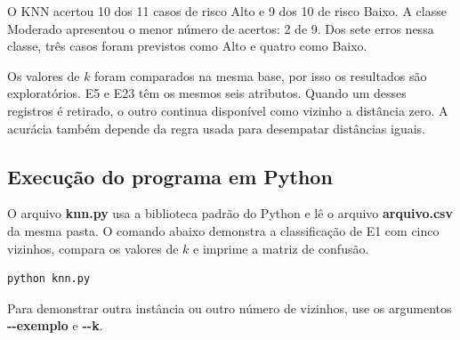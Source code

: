 \documentclass[12pt,a4paper]{article}
\begin{document}
O KNN acertou 10 dos 11 casos de risco Alto e 9 dos 10 de risco Baixo. A classe Moderado apresentou o menor número de acertos: 2 de 9. Dos sete erros nessa classe, três casos foram previstos como Alto e quatro como Baixo.

Os valores de $k$ foram comparados na mesma base, por isso os resultados são exploratórios. E5 e E23 têm os mesmos seis atributos. Quando um desses registros é retirado, o outro continua disponível como vizinho a distância zero. A acurácia também depende da regra usada para desempatar distâncias iguais.

\subsection{Execução do programa em Python}

O arquivo \textbf{knn.py} usa a biblioteca padrão do Python e lê o arquivo \textbf{arquivo.csv} da mesma pasta. O comando abaixo demonstra a classificação de E1 com cinco vizinhos, compara os valores de $k$ e imprime a matriz de confusão.

\begin{lstlisting}
python knn.py
\end{lstlisting}

{\sloppy Para demonstrar outra instância ou outro número de vizinhos, use os argumentos \mbox{\textbf{-{}-exemplo}} e \mbox{\textbf{-{}-k}}.\par}
\end{document}
